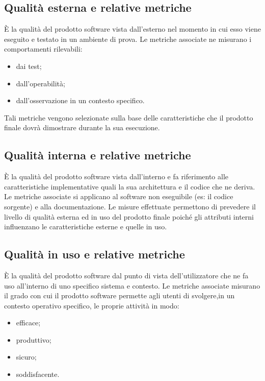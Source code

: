 {	\subsection{Qualità esterna e relative metriche}
	È la qualità del prodotto software vista dall'esterno nel momento in cui esso viene eseguito e testato in un ambiente di prova.
	Le metriche associate ne misurano i comportamenti rilevabili:
	\begin{itemize}
		\item dai test;
		\item dall'operabilità;
		\item dall'osservazione in un contesto specifico.
	\end{itemize}	
	Tali metriche vengono selezionate sulla base delle caratteristiche che il prodotto finale dovrà dimostrare durante la sua esecuzione.
	
	\subsection{Qualità interna e relative metriche}
	È la qualità del prodotto software vista dall'interno e fa riferimento alle caratteristiche implementative quali la sua architettura e il codice che ne deriva.\\
	Le metriche associate si applicano al software non eseguibile (es: il codice sorgente) e alla documentazione. Le misure effettuate permettono di prevedere il livello di qualità esterna ed in uso del prodotto finale poiché gli attributi interni influenzano le caratteristiche esterne e quelle in uso.
	
	\subsection{Qualità in uso e relative metriche}
	È la qualità del prodotto software dal punto di vista dell'utilizzatore che ne fa uso all'interno di uno specifico sistema e contesto.
	Le metriche associate misurano il grado con cui il prodotto software permette agli utenti di svolgere,in un contesto operativo specifico, le proprie attività in modo:
	\begin{itemize}
		\item efficace;
		\item produttivo;
		\item sicuro;
		\item soddisfacente.
	\end{itemize}
	
}
				









